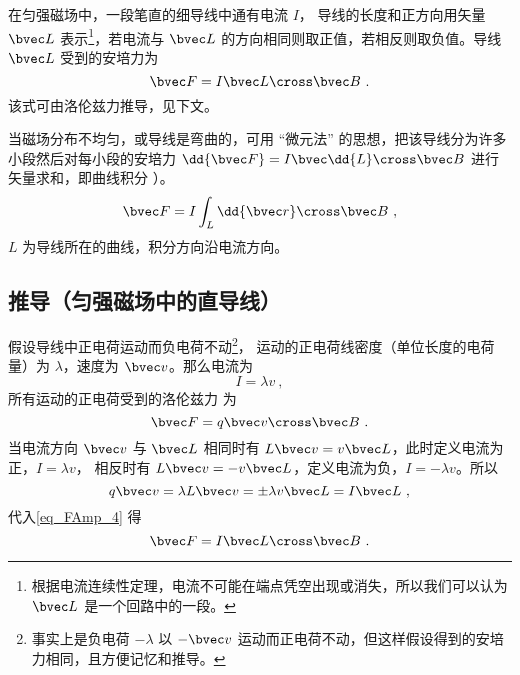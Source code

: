 

在匀强磁场中，一段笔直的细导线中通有电流 $I$， 导线的长度和正方向用矢量 $\bvec L$ 表示\footnote{根据电流连续性定理，电流不可能在端点凭空出现或消失，所以我们可以认为 $\bvec L$ 是一个回路中的一段。}，若电流与 $\bvec L$ 的方向相同则取正值，若相反则取负值。导线 $\bvec L$ 受到的安培力为
\begin{equation}\label{eq_FAmp_1}
\bvec F = I \bvec L \cross \bvec B~.
\end{equation}
该式可由洛伦兹力推导，见下文。

当磁场分布不均匀，或导线是弯曲的，可用 “微元法” 的思想，把该导线分为许多小段然后对每小段的安培力 $\dd{\bvec F} = I\bvec \dd{L} \cross\bvec B$ 进行矢量求和，即曲线积分%
）。
\begin{equation}
\bvec F = I\int_L \dd{\bvec r} \cross \bvec B~,
\end{equation}
$L$ 为导线所在的曲线，积分方向沿电流方向。

\subsection{推导（匀强磁场中的直导线）}
假设导线中正电荷运动而负电荷不动\footnote{事实上是负电荷 $-\lambda$ 以 $-\bvec v$ 运动而正电荷不动，但这样假设得到的安培力相同，且方便记忆和推导。}， 运动的正电荷线密度（单位长度的电荷量）为 $\lambda$，速度为 $\bvec v$。那么电流为%
\begin{equation}
I = \lambda v~,
\end{equation}
所有运动的正电荷受到的洛伦兹力%
为
\begin{equation}\label{eq_FAmp_4}
\bvec F =  q\bvec v \cross \bvec B~.
\end{equation}
当电流方向 $\bvec v$ 与 $\bvec L$ 相同时有 $L \bvec v = v \bvec L$，此时定义电流为正，$I = \lambda v$， 相反时有 $L \bvec v = -v\bvec L$，定义电流为负，$I = -\lambda v$。所以
\begin{equation}
q\bvec v = \lambda L \bvec v = \pm \lambda v\bvec L= I \bvec L~,
\end{equation}
代入\autoref{eq_FAmp_4} 得
\begin{equation}
\bvec F = I \bvec L \cross \bvec B~.
\end{equation}

